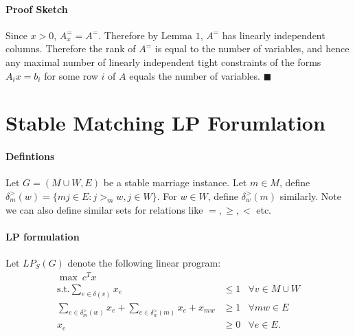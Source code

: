 \documentclass[letterpaper,12pt,oneside,onecolumn]{article}
\begin{document}
\paragraph{Proof Sketch}
Since $x > 0$, $A_x^= = A^=$. Therefore by Lemma $1$, $A^=$ has linearly independent columns. Therefore the rank of $A^=$ is equal to the number of variables, and hence any maximal number of linearly independent tight constraints of the forms $A_ix = b_i$ for some row $i$ of $A$ equals the number of variables. $\blacksquare$
\section{Stable Matching LP Forumlation}
\paragraph{Defintions}
Let $G = (M \cup W, E)$ be a stable marriage instance. Let $m \in M$, define $\delta_m^>(w) = \{mj \in E: j >_m w, j \in W\}$. For $w \in W$, define $\delta_w^>(m)$ similarly. Note we can also define similar sets for relations like $=, \geq, <$ etc.
\paragraph{LP formulation}
Let $LP_S(G)$ denote the following linear program:
\begin{align*}
\max\ c^Tx \\
\text{s.t.} \sum_{e\in \delta(v)} x_e &\leq 1 &\forall v \in M\cup W\\
\sum_{e \in \delta_m^>(w)} x_e + \sum_{e \in \delta_w^>(m)} x_e + x_{mw} &\geq 1 &\forall mw \in E \\
x_e &\geq 0 &\forall e \in E.
\end{align*}
\end{document}
